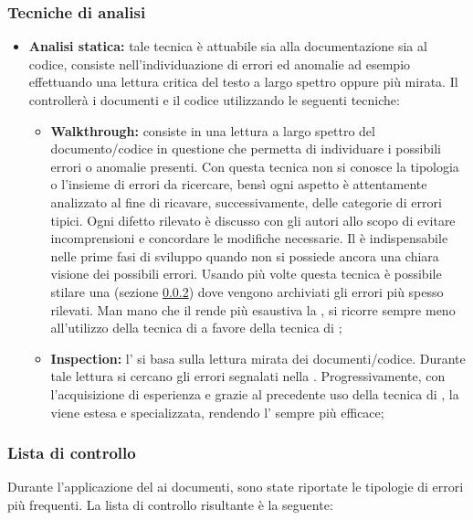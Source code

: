 \documentclass[12pt,a4paper]{article}
\begin{document}
\subsubsection{Tecniche di analisi}
\begin{itemize}
  \item \textbf{Analisi statica:} tale tecnica è attuabile sia alla documentazione sia al codice, consiste nell'individuazione di errori ed anomalie ad esempio effettuando una lettura critica del testo a largo spettro oppure più mirata. Il \VR{} controllerà i documenti e il codice utilizzando le seguenti tecniche:
    \begin{itemize}
      \item \textbf{Walkthrough:} consiste in una lettura a largo spettro del documento/codice in questione che permetta di individuare i possibili errori o anomalie presenti. Con questa tecnica non si conosce la tipologia o l'insieme di errori da ricercare, bensì ogni aspetto è attentamente analizzato al fine di ricavare, successivamente, delle categorie di errori tipici. Ogni difetto rilevato è discusso con gli autori allo scopo di evitare incomprensioni e concordare le modifiche necessarie. Il \textit{} è indispensabile nelle prime fasi di sviluppo quando non si possiede ancora una chiara visione dei possibili errori. Usando più volte questa tecnica è possibile stilare una  (sezione \ref{lista-di-controllo}) dove vengono archiviati gli errori più spesso rilevati. Man mano che il \VR{} rende più esaustiva la , si ricorre sempre meno all'utilizzo della tecnica di \textit{} a favore della tecnica di \textit{};
      \item \textbf{Inspection:} l'\textit{} si basa sulla lettura mirata dei documenti/codice. Durante tale lettura si cercano gli errori segnalati nella . Progressivamente, con l'acquisizione di esperienza e grazie al precedente uso della tecnica di \textit{}, la  viene estesa e specializzata, rendendo l'\textit{} sempre più efficace;
        \end{itemize}
\end{itemize}

\subsubsection{Lista di controllo}\label{lista-di-controllo}
Durante l'applicazione del \textit{} ai documenti, sono state riportate le tipologie di errori più frequenti. La lista
di controllo risultante è la seguente:
\end{document}
